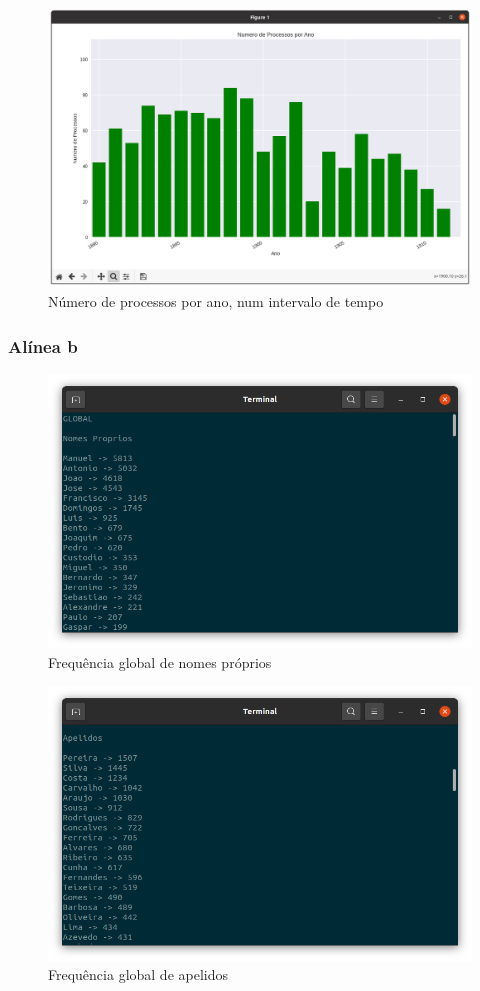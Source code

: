 \documentclass[a4paper, 11pt]{article}
\begin{document}
\begin{figure}[H]
    \centering
    \includegraphics[width=.8\textwidth]{img/m2.png}
    \caption{Número de processos por ano, num intervalo de tempo}
\end{figure}

\subsubsection{Alínea b}

\begin{figure}[H]
    \centering
    \includegraphics[width=.8\textwidth]{img/nomes.png}
    \caption{Frequência global de nomes próprios}
\end{figure}

\begin{figure}[H]
    \centering
    \includegraphics[width=.8\textwidth]{img/apelidos.png}
    \caption{Frequência global de apelidos}
\end{figure}
\end{document}
